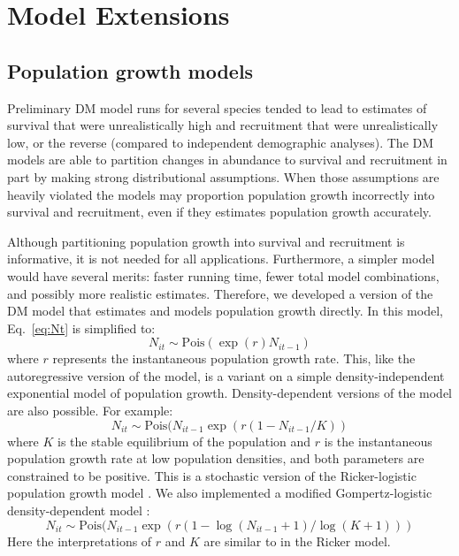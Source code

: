 \documentclass[12pt]{article}
\begin{document}
\section{Model Extensions}
\label{sec:ext}

\subsection{Population growth models}

Preliminary DM model runs for several species tended to lead to
estimates of survival that were unrealistically high and recruitment
that were unrealistically low, or the reverse (compared to independent
demographic analyses).  The DM models are able to partition changes in
abundance to survival and recruitment in part by making strong
distributional assumptions. %
When those assumptions are heavily violated the models may proportion
population growth incorrectly into survival and recruitment, even if
they estimates population growth accurately.

Although partitioning population growth into survival and recruitment
is informative, it is not needed for all applications.  Furthermore, a
simpler model would have several merits: faster running time, fewer
total model combinations, and possibly more realistic estimates.
Therefore, we developed a version of the DM model that estimates and
models population growth directly.  In this model, Eq.~\ref{eq:Nt} is
simplified to:
\begin{equation}
  N_{it} \sim \text{Pois}(\exp(r)N_{it-1})
\label{eq:exp}
\end{equation}
where $r$ represents the instantaneous population growth rate.  This,
like the autoregressive version of the model, is a variant on a simple
density-independent exponential model of population growth.
Density-dependent versions of the model are also possible.  For
example:
\begin{equation}
  N_{it} \sim \text{Pois}(N_{it-1}\exp(r(1-N_{it-1}/K))
\label{eq:rick}
\end{equation}
where $K$ is the stable equilibrium of the population and $r$ is the
instantaneous population growth rate at low population densities, and
both parameters are constrained to be positive.  This is a stochastic version
of the Ricker-logistic population growth model \citep{ricker:1954}.  We also 
implemented a modified Gompertz-logistic density-dependent
model \citep{hart_gotelli:2011}:
\begin{equation}
  N_{it} \sim \text{Pois}(N_{it-1}\exp(r(1-\log(N_{it-1}+1)/\log(K+1)))
\label{eq:gomp}
\end{equation}
Here the interpretations of $r$ and $K$ are similar to in the Ricker model.
\end{document}
